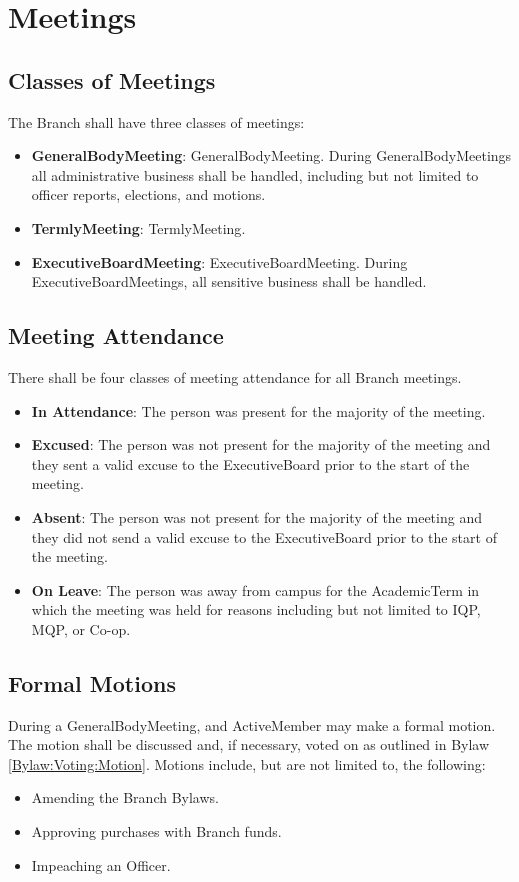 \chapter{Meetings}\label{Bylaw:Meetings}

\section{Classes of Meetings}\label{Bylaw:Meetings:Classes}
	The \gls{Branch} shall have three classes of meetings:
	\begin{itemize}
		\item{\textbf{\Gls{GeneralBodyMeeting}}: \Glsdesc{GeneralBodyMeeting}. During \glspl{GeneralBodyMeeting} all administrative business shall be handled, including but not limited to officer reports, elections, and motions.}
		\item{\textbf{\Gls{TermlyMeeting}}: \Glsdesc{TermlyMeeting}.}
		\item{\textbf{\Gls{ExecutiveBoardMeeting}}: \Glsdesc{ExecutiveBoardMeeting}. During \glspl{ExecutiveBoardMeeting}, all sensitive business shall be handled.}
	\end{itemize}

\section{Meeting Attendance}\label{Bylaw:Meetings:Attendance}
	There shall be four classes of meeting attendance for all \gls{Branch} meetings.
	\begin{itemize}
		\item{\textbf{In Attendance}: The person was present for the majority of the meeting.}
		\item{\textbf{Excused}: The person was not present for the majority of the meeting and they sent a valid excuse to the \gls{ExecutiveBoard} prior to the start of the meeting.}
		\item{\textbf{Absent}: The person was not present for the majority of the meeting and they did not send a valid excuse to the \gls{ExecutiveBoard} prior to the start of the meeting.}
		\item{\textbf{On Leave}: The person was away from campus for the \gls{AcademicTerm} in which the meeting was held for reasons including but not limited to \gls{IQP}, \gls{MQP}, or Co-op.}
	\end{itemize}

\section{Formal Motions}\label{Bylaw:Meetings:Motions}
	During a \gls{GeneralBodyMeeting}, and \gls{ActiveMember} may make a formal motion. The motion shall be discussed and, if necessary, voted on as outlined in \Gls{Bylaw} \ref{Bylaw:Voting:Motion}. Motions include, but are not limited to, the following: 
	\begin{itemize}
		\item{Amending the \gls{Branch} \Glspl{Bylaw}.}
		\item{Approving purchases with \gls{Branch} funds.}
		\item{Impeaching an \gls{Officer}.}
	\end{itemize}

